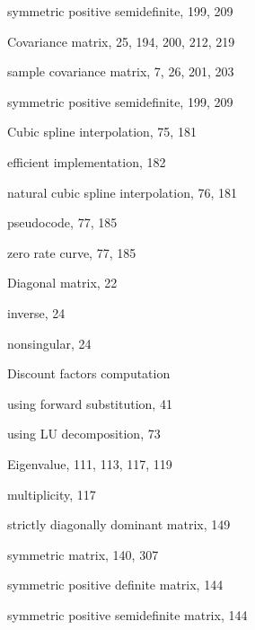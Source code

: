 {\noindent\hspace*{1.4em}symmetric positive semidefinite, 199, 209

\noindent Covariance matrix, 25, 194, 200, 212, 219

\noindent\hspace*{1.4em}sample covariance matrix, 7, 26, 201, 203

\noindent\hspace*{1.4em}symmetric positive semidefinite, 199, 209

\noindent Cubic spline interpolation, 75, 181

\noindent\hspace*{1.4em}efficient implementation, 182

\noindent\hspace*{1.4em}natural cubic spline interpolation, 76, 181

\noindent\hspace*{1.4em}pseudocode, 77, 185

\noindent\hspace*{1.4em}zero rate curve, 77, 185

\medskip
\noindent Diagonal matrix, 22

\noindent\hspace*{1.4em}inverse, 24

\noindent\hspace*{1.4em}nonsingular, 24

\noindent Discount factors computation

\noindent\hspace*{1.4em}using forward substitution, 41

\noindent\hspace*{1.4em}using LU decomposition, 73

\medskip
\noindent Eigenvalue, 111, 113, 117, 119

\noindent\hspace*{1.4em}multiplicity, 117

\noindent\hspace*{1.4em}strictly diagonally dominant matrix, 149

\noindent\hspace*{1.4em}symmetric matrix, 140, 307

\noindent\hspace*{1.4em}symmetric positive definite matrix, 144

\noindent\hspace*{1.4em}symmetric positive semidefinite matrix, 144

}
